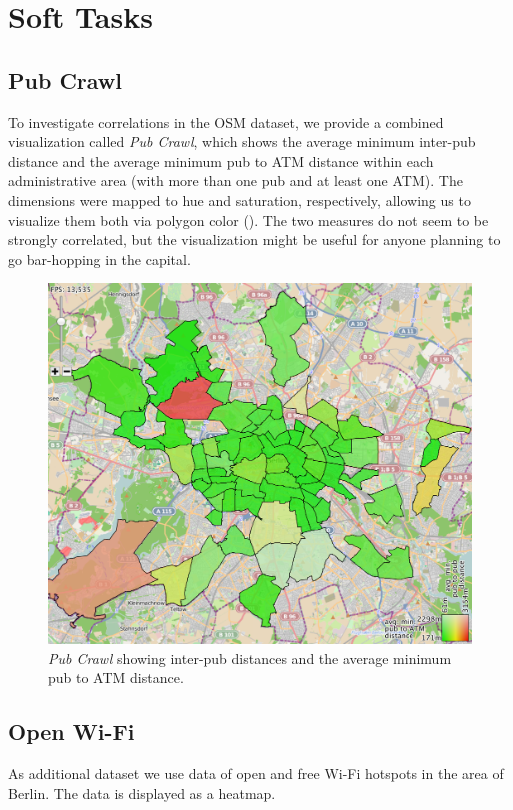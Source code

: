\section*{Soft Tasks}
\subsection*{Pub Crawl}
To investigate correlations in the OSM dataset, we provide a combined visualization
called \emph{Pub Crawl},
which shows the average minimum inter-pub distance and the average
minimum pub to ATM distance within each administrative area
(with more than one pub and at least one ATM). The dimensions were mapped to hue
and saturation, respectively, allowing us to visualize them both via polygon color ().
The two measures do not seem to be strongly correlated, but the visualization might
be useful for anyone planning to go bar-hopping in the capital.

\begin{figure}
\centering
\includegraphics[width=0.9\linewidth]{imgs/crawl}
\caption{\emph{Pub Crawl} showing inter-pub distances 
and the average minimum pub to ATM distance.}
\label{fig:crawl}
\end{figure}

\subsection*{Open Wi-Fi}

As additional dataset we use data of open and free Wi-Fi hotspots in
the area of Berlin.
The data is displayed as a heatmap.


